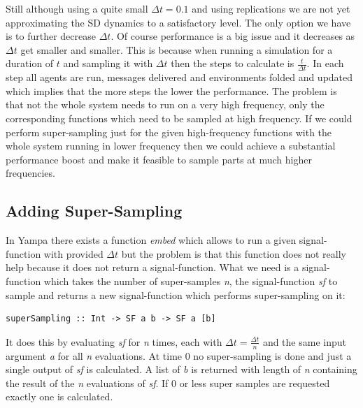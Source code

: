 
Still although using a quite small $\Delta t = 0.1$ and using replications we are not yet approximating the SD dynamics to a satisfactory level. The only option we have is to further decrease $\Delta t$. Of course performance is a big issue and it decreases as $\Delta t$ get smaller and smaller. This is because when running a simulation for a duration of $t$ and sampling it with $\Delta t$ then the steps to calculate is $\frac{t}{\Delta t}$. In each step all agents are run, messages delivered and environments folded and updated which implies that the more steps the lower the performance. The problem is that not the whole system needs to run on a very high frequency, only the corresponding functions which need to be sampled at high frequency. If we could perform super-sampling just for the given high-frequency functions with the whole system running in lower frequency then we could achieve a substantial performance boost and make it feasible to sample parts at much higher frequencies.

\subsection{Adding Super-Sampling}
In Yampa there exists a function \textit{embed} which allows to run a given signal-function with provided $\Delta t$ but the problem is that this function does not really help because it does not return a signal-function. What we need is a signal-function which takes the number of super-samples \textit{n}, the signal-function \textit{sf} to sample and returns a new signal-function which performs super-sampling on it:

\begin{verbatim}
superSampling :: Int -> SF a b -> SF a [b]
\end{verbatim}

It does this by evaluating \textit{sf} for \textit{n} times, each with $\Delta t = \frac{\Delta t}{n}$ and the same input argument \textit{a} for all \textit{n} evaluations. At time 0 no super-sampling is done and just a single output of \textit{sf} is calculated. A list of \textit{b} is returned with length of \textit{n} containing the result of the \textit{n} evaluations of \textit{sf}. If 0 or less super samples are requested exactly one is calculated.

